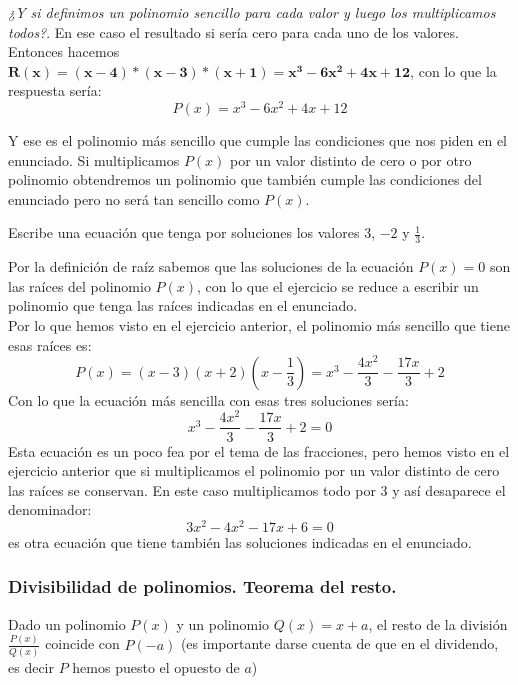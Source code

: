 \documentclass[a4paper,11pt,answers]{exam}
\begin{document}
\begin{questions}
\begin{solution}
    \emph{¿Y si definimos un polinomio sencillo para cada valor y luego los multiplicamos todos?}.
    En ese caso el resultado si sería cero para cada uno de los valores.\\
    Entonces hacemos $\boldsymbol{R(x) = (x-4)*(x-3)*(x+1) = x^3 -6x^2 + 4x + 12}$, con lo que la
    respuesta sería:
    \[P(x) = x^3 -6x^2 + 4x + 12\]

    Y ese es el polinomio más sencillo que cumple las condiciones que nos piden en el enunciado.
    Si multiplicamos $P(x)$ por un valor distinto de cero o por otro polinomio obtendremos un
    polinomio que también cumple las condiciones del enunciado pero no será tan sencillo
    como $P(x)$.
  \end{solution}
\question Escribe una ecuación que tenga por soluciones los valores $3$, $-2$ y $\frac{1}{3}$.
  \begin{solution}
    Por la definición de raíz sabemos que las soluciones de la ecuación $P(x) = 0$ son las
    raíces del polinomio $P(x)$, con lo que el ejercicio se reduce a escribir un polinomio
    que tenga las raíces indicadas en el enunciado.\\

    Por lo que hemos visto en el ejercicio anterior, el polinomio más sencillo que tiene esas
    raíces es:
    \[P(x) = (x-3)(x+2)\left(x -\frac{1}{3}\right) = x^3 - \frac{4x^2}{3} - \frac{17x}{3} + 2\]
    Con lo que la ecuación más sencilla con esas tres soluciones sería:
    \[x^3 - \frac{4x^2}{3} - \frac{17x}{3} + 2 = 0\]
    Esta ecuación es un poco fea por el tema de las fracciones, pero hemos visto en el ejercicio
    anterior que si multiplicamos el polinomio por un valor distinto de cero las raíces se
    conservan. En este caso multiplicamos todo por $3$ y así desaparece el denominador:
    \[3x^2 - 4x^2 - 17x + 6 = 0\]
    es otra ecuación que tiene también las soluciones indicadas en el enunciado.
  \end{solution}
\end{questions}

\subsubsection{Divisibilidad de polinomios. Teorema del resto.}
Dado un polinomio $P(x)$ y un polinomio $Q(x) = x+a$, el resto de la división $\frac{P(x)}{Q(x)}$ coincide con $P(-a)$ (es importante darse cuenta de que en el dividendo, es decir $P$ hemos puesto el opuesto de $a$)\\
\end{document}
